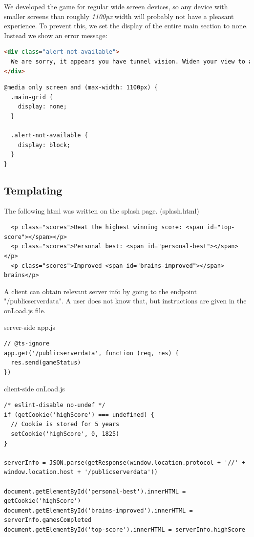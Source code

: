 \documentclass{article}
\begin{document}
We developed the game for regular wide screen devices, so any device with smaller screens than roughly \textit{1100px} width will probably not have a pleasant experience. To prevent this, we set the display of the entire main section to none. Instead we show an error message:

\begin{lstlisting}[language=html]
<div class="alert-not-available">
  We are sorry, it appears you have tunnel vision. Widen your view to a width of 1100px
</div>
\end{lstlisting}

\begin{lstlisting}
@media only screen and (max-width: 1100px) {
  .main-grid {
    display: none;
  }

  .alert-not-available {
    display: block;
  }
}
\end{lstlisting}

\subsection{Templating}

The following html was written on the splash page. (splash.html)
\begin{lstlisting}
  <p class="scores">Beat the highest winning score: <span id="top-score"></span></p>
  <p class="scores">Personal best: <span id="personal-best"></span></p>
  <p class="scores">Improved <span id="brains-improved"></span> brains</p>
\end{lstlisting}

A client can obtain relevant server info by going to the endpoint "/publicserverdata". A user does not know that, but instructions are given in the onLoad.js file.

server-side app.js
\begin{lstlisting}
// @ts-ignore
app.get('/publicserverdata', function (req, res) {
  res.send(gameStatus)
})
\end{lstlisting}

client-side onLoad.js
\begin{lstlisting}
/* eslint-disable no-undef */
if (getCookie('highScore') === undefined) {
  // Cookie is stored for 5 years
  setCookie('highScore', 0, 1825)
}

serverInfo = JSON.parse(getResponse(window.location.protocol + '//' + window.location.host + '/publicserverdata'))

document.getElementById('personal-best').innerHTML = getCookie('highScore')
document.getElementById('brains-improved').innerHTML = serverInfo.gamesCompleted
document.getElementById('top-score').innerHTML = serverInfo.highScore
\end{lstlisting}
\end{document}
